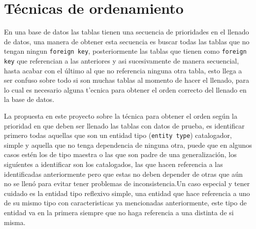 \section{T\'ecnicas de ordenamiento}
En una base de datos las tablas tienen una secuencia de prioridades en el llenado de datos, una manera de obtener esta secuencia es buscar todas las tablas que no tengan ningun \texttt{foreign key}, posteriormente las tablas que tienen como \texttt{foreign key} que referencian a las anteriores y asi sucesivamente de manera secuencial, hasta acabar con el \'ultimo al que no referencia ninguna otra tabla, esto llega a ser confuso sobre todo si son muchas tablas al momento de hacer el llenado, para lo cual es necesario alguna t'ecnica para obtener el orden correcto del llenado en la base de datos.

La propuesta en este proyecto sobre la t\'ecnica para obtener el orden seg\'un la prioridad en que deben ser llenado las tablas con datos de prueba, es identificar primero todas aquellas que son un entidad tipo (\texttt{entity type}) catalogador, simple y  aquella que no tenga dependencia de ninguna otra, puede que en algunos casos est\'en los de tipo maestra  o las que son padre de una generalizaci\'on, los  sigu\'ientes a identificar son los catalogados, las que hacen referencia a las identificadas anteriormente pero que estas no deben depender de otras que a\'un no se llen\'o para evitar  tener problemas de inconsistencia.Un caso especial y tener cuidado es la entidad tipo reflexivo simple, una entidad que hace referencia a uno de su mismo tipo con caracteristicas ya mencionadas anteriormente, este tipo de entidad va en la primera siempre que no haga referencia a una distinta de si misma.  
